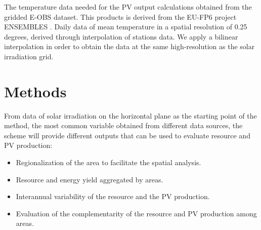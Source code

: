 
The temperature data needed for the PV output calculations obtained from the gridded E-OBS dataset. This products is derived from the EU-FP6 project ENSEMBLES \cite*{Haylock2008}. Daily data of mean temperature in a spatial resolution of 0.25 degrees, derived through interpolation of stations data. We apply a bilinear interpolation in order to obtain the data at the same high-resolution as the solar irradiation grid. 

\section{Methods}

From data of solar irradiation on the horizontal plane as the starting point of the method, the most common variable obtained from different data sources, the scheme will provide different outputs that can be used to evaluate resource and PV production:

\begin{itemize}
\item Regionalization of the area to facilitate the spatial analysis.
\item Resource and energy yield aggregated by areas.
\item Interannual variability of the resource and the PV production.
\item Evaluation of the complementarity of the resource and PV production among areas.
\end{itemize}  
 
